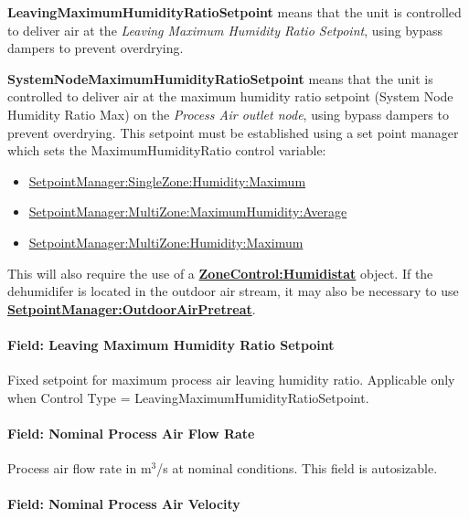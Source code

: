 \textbf{LeavingMaximumHumidityRatioSetpoint} means that the unit is controlled to deliver air at the \emph{Leaving Maximum Humidity Ratio Setpoint}, using bypass dampers to prevent overdrying.

\textbf{SystemNodeMaximumHumidityRatioSetpoint} means that the unit is controlled to deliver air at the maximum humidity ratio setpoint (System Node Humidity Ratio Max) on the \emph{Process Air outlet node}, using bypass dampers to prevent overdrying. This setpoint must be established using a set point manager which sets the MaximumHumidityRatio control variable:

\begin{itemize}
\item
  \hyperref[setpointmanagersinglezonehumiditymaximum]{SetpointManager:SingleZone:Humidity:Maximum}
\item
  \hyperref[setpointmanagermultizonemaximumhumidityaverage]{SetpointManager:MultiZone:MaximumHumidity:Average}
\item
  \hyperref[setpointmanagermultizonehumiditymaximum]{SetpointManager:MultiZone:Humidity:Maximum}
\end{itemize}

This will also require the use of a \textbf{\hyperref[zonecontrolhumidistat]{ZoneControl:Humidistat}} object. If the dehumidifer is located in the outdoor air stream, it may also be necessary to use \textbf{\hyperref[setpointmanageroutdoorairpretreat]{SetpointManager:OutdoorAirPretreat}}.

\paragraph{Field: Leaving Maximum Humidity Ratio Setpoint}\label{field-leaving-maximum-humidity-ratio-setpoint}

Fixed setpoint for maximum process air leaving humidity ratio. Applicable only when Control Type = LeavingMaximumHumidityRatioSetpoint.

\paragraph{Field: Nominal Process Air Flow Rate}\label{field-nominal-process-air-flow-rate}

Process air flow rate in m\(^{3}\)/s at nominal conditions. This field is autosizable.

\paragraph{Field: Nominal Process Air Velocity}\label{field-nominal-process-air-velocity}

